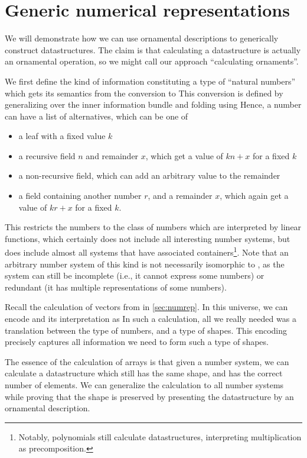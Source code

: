\section{Generic numerical representations}\label{sec:trieo}
We will demonstrate how we can use ornamental descriptions to generically construct datastructures. The claim is that calculating a datastructure is actually an ornamental operation, so we might call our approach ``calculating ornaments''. 

We first define the kind of information constituting a type of ``natural numbers''
which gets its semantics from the conversion to \bN{}
This conversion is defined by generalizing over the inner information bundle and folding using
Hence, a number can have a list of alternatives, which can be one of
\begin{itemize}
    \item a leaf with a fixed value $k$
    \item a recursive field $n$ and remainder $x$, which get a value of $kn + x$ for a fixed $k$
    \item a non-recursive field, which can add an arbitrary value to the remainder
    \item a field containing another number $r$, and a remainder $x$, which again get a value of $kr + x$ for a fixed $k$.
\end{itemize}
This restricts the numbers to the class of numbers which are interpreted by linear functions, which certainly does not include all interesting number systems, but does include almost all systems that have associated containers\footnote{Notably, polynomials still calculate datastructures, interpreting multiplication as precomposition.}. Note that an arbitrary number system of this kind is not necessarily isomorphic to \bN{}, as the system can still be incomplete (i.e., it cannot express some numbers) or redundant (it has multiple representations of some numbers).

Recall the calculation of vectors from \bN{} in \autoref{sec:numrep}. In this universe, we can encode \bN{} and its interpretation as
In such a calculation, all we really needed was a translation between the type of numbers, and a type of shapes. This encoding precisely captures all information we need to form such a type of shapes.

The essence of the calculation of arrays is that given a number system, we can calculate a datastructure which still has the same shape, and has the correct number of elements. We can generalize the calculation to all number systems while proving that the shape is preserved by presenting the datastructure by an ornamental description.


